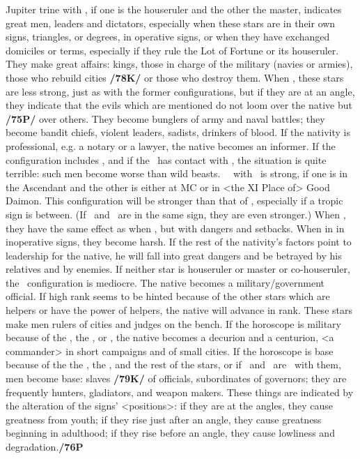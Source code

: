 Jupiter \marginnote{\Jupiter \Trine \Mars} trine with \Mars, if one is the houseruler and the other the master, indicates great men, leaders and dictators, especially when these stars are in their own signs, triangles, or degrees, in operative signs, or when they have exchanged domiciles or terms, especially if they rule the Lot of Fortune or its houseruler. They make great affairs: kings, those in charge of the military (navies or armies), those who rebuild cities
\textbf{/78K/} or those who destroy them. When \Sextile, these stars are less strong, just as with the former configurations, but if they are at an \mndl angle, they indicate that the evils which are mentioned do not loom over the native but \textbf{/75P/} over others. They become bunglers of army and naval battles; they become bandit chiefs, violent leaders, sadists, drinkers of blood. If the nativity is professional, e.g. a notary or a lawyer, the native becomes an informer. If the configuration includes \Mercury, and if the \Moon\, has contact with \Mars, the situation is quite terrible: such men become worse than wild beasts. \Jupiter\, \Square\, with \Mars\, is strong, if one is in the Ascendant and the other is either at MC or in <the
XI Place of> Good Daimon. This configuration will be stronger than that of \Trine, especially if a tropic
sign is between. (If \Jupiter\, and \Mars\, are in the same sign, they are even stronger.) When \Square, they
have the same effect as when \Trine, but with dangers and setbacks. When in \Opposition in inoperative signs, they become harsh. If the rest of the nativity’s factors point to leadership for the native, he will fall into great dangers and be betrayed by his relatives and by enemies. \mndl If neither star is houseruler or master or co-houseruler, the \Trine\, configuration is mediocre. The native becomes a military/government official. If high rank seems to be hinted because of the other stars which are helpers or have the power of helpers, the native will advance in rank. These stars make men rulers of cities and judges on the bench. If the horoscope is military because of the \Sun, the \Moon, or \Saturn, the native becomes a decurion and a centurion, <a commander> in short campaigns and of small cities. If the horoscope is base because of the the \Sun, the \Moon, and the rest of the stars, or if \Mars\, and \Jupiter\, are \Trine\, with them, men become base: slaves \textbf{/79K/} of officials, subordinates of governors; they are frequently hunters, gladiators, and weapon makers. \mndl These things are indicated by the alteration of the signs’ <positions>: if they are at the angles, they cause greatness from youth; if they rise just after an angle, they cause greatness beginning in adulthood; if they rise before an angle, they cause lowliness and degradation.\textbf{/76P}

\newpage